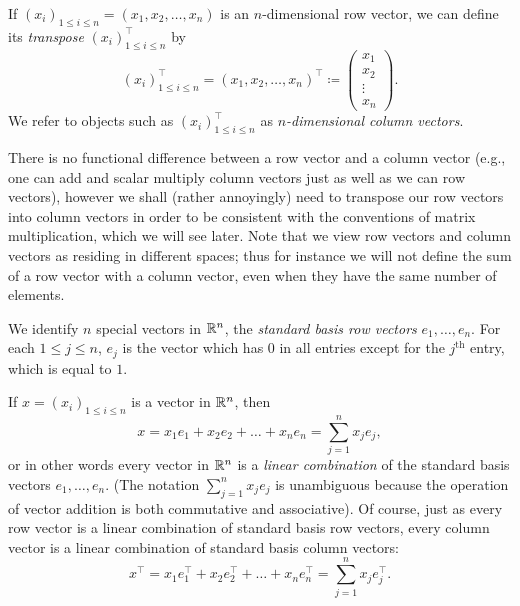 \begin{defn}[Transpose]\label{6.1.3}
  If \((x_i)_{1 \leq i \leq n} = (x_1, x_2, \dots, x_n)\) is an \(n\)-dimensional row vector, we can define its \emph{transpose} \((x_i)_{1 \leq i \leq n}^\top\) by
  \[
    (x_i)_{1 \leq i \leq n}^\top = (x_1, x_2, \dots, x_n)^\top \coloneqq \begin{pmatrix}
      x_1    \\
      x_2    \\
      \vdots \\
      x_n
    \end{pmatrix}.
  \]
  We refer to objects such as \((x_i)_{1 \leq i \leq n}^\top\) as \emph{\(n\)-dimensional column vectors}.
\end{defn}

\begin{rmk}\label{6.1.4}
  There is no functional difference between a row vector and a column vector (e.g., one can add and scalar multiply column vectors just as well as we can row vectors), however we shall (rather annoyingly) need to transpose our row vectors into column vectors in order to be consistent with the conventions of matrix multiplication, which we will see later.
  Note that we view row vectors and column vectors as residing in different spaces;
  thus for instance we will not define the sum of a row vector with a column vector, even when they have the same number of elements.
\end{rmk}

\begin{defn}\label{6.1.5}
  We identify \(n\) special vectors in \(\mathbb{R}^n\), the \emph{standard basis row vectors} \(e_1, \dots, e_n\).
  For each \(1 \leq j \leq n\), \(e_j\) is the vector which has \(0\) in all entries except for the \(j^{\text{th}}\) entry, which is equal to \(1\).
\end{defn}

\begin{note}
  If \(x = (x_i)_{1 \leq i \leq n}\) is a vector in \(\mathbb{R}^n\), then
  \[
    x = x_1 e_1 + x_2 e_2 + \dots + x_n e_n = \sum_{j = 1}^n x_j e_j,
  \]
  or in other words every vector in \(\mathbb{R}^n\) is a \emph{linear combination} of the standard basis vectors \(e_1, \dots, e_n\).
  (The notation \(\sum_{j = 1}^n x_j e_j\) is unambiguous because the operation of vector addition is both commutative and associative).
  Of course, just as every row vector is a linear combination of standard basis row vectors, every column vector is a linear combination of standard basis column vectors:
  \[
    x^\top = x_1 e_1^\top + x_2 e_2^\top + \dots + x_n e_n^\top = \sum_{j = 1}^n x_j e_j^\top.
  \]
\end{note}

